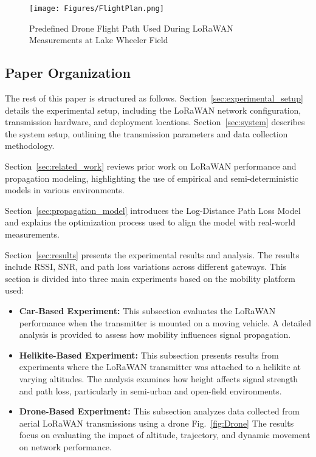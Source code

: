 \documentclass[journal]{IEEEtran}
\begin{document}
\begin{figure}[!t]
    \centering
    \texttt{[image: Figures/FlightPlan.png]}
    \caption{Predefined Drone Flight Path Used During LoRaWAN Measurements at Lake Wheeler Field}
    \label{fig:FlightPlanLW}
\end{figure}


\subsection{Paper Organization}
The rest of this paper is structured as follows. Section~\ref{sec:experimental_setup} details the experimental setup, including the LoRaWAN network configuration, transmission hardware, and deployment locations. Section~\ref{sec:system} describes the system setup, outlining the transmission parameters and data collection methodology.

Section~\ref{sec:related_work} reviews prior work on LoRaWAN performance and propagation modeling, highlighting the use of empirical and semi-deterministic models in various environments.


Section~\ref{sec:propagation_model} introduces the Log-Distance Path Loss Model and explains the optimization process used to align the model with real-world measurements. 

Section~\ref{sec:results} presents the experimental results and analysis. The results include RSSI, SNR, and path loss variations across different gateways. This section is divided into three main experiments based on the mobility platform used:
\begin{itemize}
    \item \textbf{Car-Based Experiment:} This subsection evaluates the LoRaWAN performance when the transmitter is mounted on a moving vehicle. A detailed analysis is provided to assess how mobility influences signal propagation.
    \item \textbf{Helikite-Based Experiment:} This subsection presents results from experiments where the LoRaWAN transmitter was attached to a helikite at varying altitudes. The analysis examines how height affects signal strength and path loss, particularly in semi-urban and open-field environments.
    \item \textbf{Drone-Based Experiment:} This subsection analyzes data collected from aerial LoRaWAN transmissions using a drone Fig.~\ref{fig:Drone} The results focus on evaluating the impact of altitude, trajectory, and dynamic movement on network performance.
\end{itemize}
\end{document}

